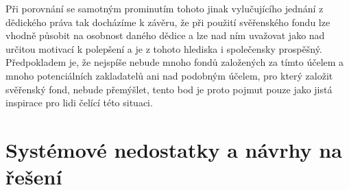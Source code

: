 \documentclass{article}
\begin{document}
Při porovnání se samotným prominutím tohoto jinak vylučujícího jednání z dědického práva tak docházíme k závěru, že při použití svěřenského fondu lze vhodně působit na osobnost daného dědice a lze nad ním uvažovat jako nad určitou motivací k polepšení a je z tohoto hlediska i společensky prospěšný. Předpokladem je, že nejspíše nebude mnoho fondů založených za tímto účelem a mnoho potenciálních zakladatelů ani nad podobným účelem, pro který založit svěřenský fond, nebude přemýšlet, tento bod je proto pojmut pouze jako jistá inspirace pro lidi čelící této situaci.\\

\newpage


\section{Systémové nedostatky a návrhy na řešení}





\end{document}
